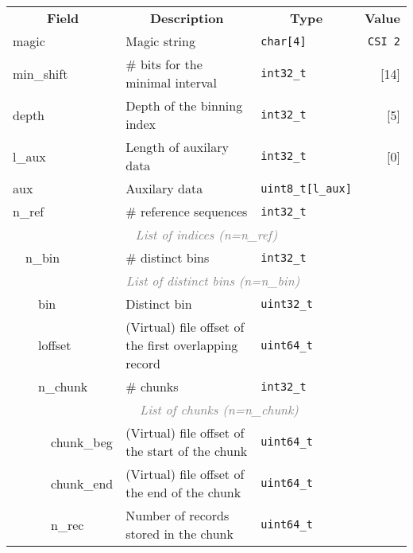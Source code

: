 \documentclass[10pt]{article}
\begin{document}
\begin{table}[h]
{\small
\begin{tabular}{|l|l|l|l|l|l|r|}
  \cline{1-7}
  \multicolumn{4}{|c|}{\bf Field} & \multicolumn{1}{c|}{\bf Description} & \multicolumn{1}{c|}{\bf Type} & \multicolumn{1}{c|}{\bf Value} \\\cline{1-7}
  \multicolumn{4}{|l|}{\sf magic} & Magic string & {\tt char[4]} & {\tt CSI\char92 2}\\\cline{1-7}
  \multicolumn{4}{|l|}{\sf min\_shift} & \# bits for the minimal interval & {\tt int32\_t} & [14]\\\cline{1-7}
  \multicolumn{4}{|l|}{\sf depth} & Depth of the binning index & {\tt int32\_t} & [5]\\\cline{1-7}
  \multicolumn{4}{|l|}{\sf l\_aux} & Length of auxilary data & {\tt int32\_t} & [0]\\\cline{1-7}
  \multicolumn{4}{|l|}{\sf aux} & Auxilary data & {\tt uint8\_t[l\_aux]} & \\\cline{1-7}
  \multicolumn{4}{|l|}{\sf n\_ref} & \# reference sequences & {\tt int32\_t} & \\\cline{1-7}
  \multicolumn{7}{|c|}{\textcolor{gray}{\it List of indices (n=n\_ref)}} \\\cline{2-7}
  & \multicolumn{3}{l|}{\sf n\_bin} & \# distinct bins & {\tt int32\_t} & \\\cline{2-7}
  & \multicolumn{6}{c|}{\textcolor{gray}{\it List of distinct bins (n=n\_bin)}} \\\cline{3-7}
  & & \multicolumn{2}{l|}{\sf bin} & Distinct bin & {\tt uint32\_t} & \\\cline{3-7}
  & & \multicolumn{2}{l|}{\sf loffset} & (Virtual) file offset of the first overlapping record & {\tt uint64\_t} & \\\cline{3-7}
  & & \multicolumn{2}{l|}{\sf n\_chunk} & \# chunks & {\tt int32\_t} & \\\cline{3-7}
  & & \multicolumn{5}{c|}{\textcolor{gray}{\it List of chunks (n=n\_chunk)}} \\\cline{4-7}
  & & & {\sf chunk\_beg} & (Virtual) file offset of the start of the chunk & {\tt uint64\_t} & \\\cline{4-7}
  & & & {\sf chunk\_end} & (Virtual) file offset of the end of the chunk & {\tt uint64\_t} & \\\cline{4-7}
  & & & {\sf n\_rec}     & Number of records stored in the chunk & {\tt uint64\_t} & \\\cline{2-7}
  \cline{1-7}
\end{tabular}}
\end{table}
\end{document}
